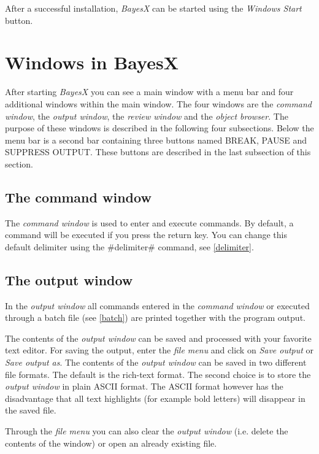 After a successful installation, {\em BayesX} can be started using
the {\em Windows Start} button.

\section{Windows in BayesX}

After starting {\em BayesX} you can see a main window with a menu
bar and four additional windows within the main window. The four
windows are the {\em command window}, the {\em output window}, the
{\em review window} and the {\em object browser}. The purpose of
these windows is described in the following four subsections.
Below the menu bar is a second bar containing three buttons named
BREAK, PAUSE and SUPPRESS OUTPUT. These buttons are described in
the last subsection of this section.

\subsection{The command window}

  The {\em command window}
is used to enter and execute commands. By default, a command will
be executed if you press the return key. You can change this
default delimiter using the #delimiter# command, see
\autoref{delimiter}.

\subsection{The output window}
 

In the {\em output window} all commands entered in the {\em
command window} or executed through a batch file (see
\autoref{batch}) are printed together with the program output.

 The contents of the {\em output window} can be
saved and processed with your favorite text editor. For saving the
output, enter the {\em file menu} and click on {\em Save output}
or {\em Save output as}. The contents of the {\em output window} can be
saved in two different file formats. The default is the rich-text
format. The second choice is to store the {\em output window} in plain
ASCII format. The ASCII format however has the disadvantage that
all text highlights (for example bold letters) will disappear in
the saved file.

Through the {\em file menu} you can also clear the {\em output window}
(i.e. delete the contents of the window) or open an already
existing file.

